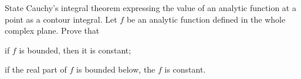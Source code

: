 State Cauchy's integral theorem expressing the value of an analytic
function at a point as a contour integral. Let $f$ be an analytic
function defined in the whole complex plane. Prove that
\begin{alist}
\item if $f$ is bounded, then it is constant;
\item if the real part of $f$ is bounded below, the $f$ is constant.
\end{alist}
